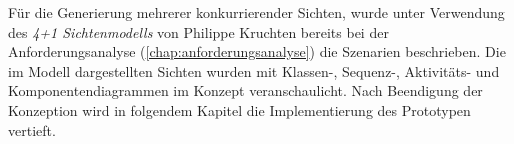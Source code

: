 




Für die Generierung mehrerer konkurrierender Sichten, wurde unter Verwendung des \textit{4+1 Sichtenmodells} von Philippe Kruchten \cite{Kruchten1995}
bereits bei der Anforderungsanalyse (\ref{chap:anforderungsanalyse}) die Szenarien beschrieben. Die im Modell dargestellten Sichten wurden mit 
Klassen-, Sequenz-, Aktivitäts- und Komponentendiagrammen im Konzept veranschaulicht. Nach Beendigung der Konzeption wird in folgendem Kapitel die 
Implementierung des Prototypen vertieft. 
